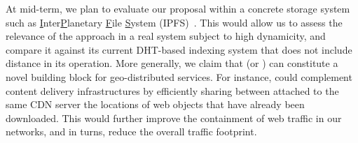 %
%
%

At mid-term, we plan to evaluate our proposal within a concrete
storage system such as \underline{I}nter\underline{P}lanetary
\underline{F}ile \underline{S}ystem
(IPFS)~\cite{ipfs}. This would allow us to assess the
relevance of the \NAME approach in a real system subject to high
dynamicity, and compare it against its current DHT-based indexing
system that does not include distance in its operation. More
generally, we claim that \NAME (or \NAMEC) can constitute a novel
building block for geo-distributed services.  For instance, \NAME
could complement content delivery infrastructures by efficiently
sharing between \processes attached to the same CDN server the
locations of web objects that have already been downloaded. This would
further improve the containment of web traffic in our networks, and in
turns, reduce the overall traffic footprint.




